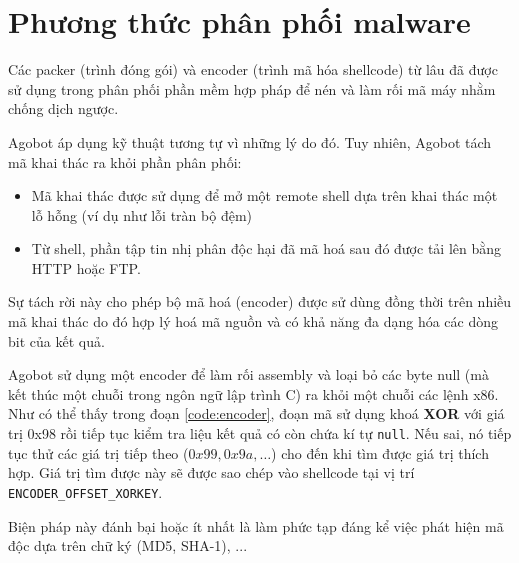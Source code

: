 \section{Phương thức phân phối malware}
Các \gls{packer} (trình đóng gói) và \gls{encoder} (trình mã hóa shellcode) từ lâu đã được sử dụng
trong phân phối phần mềm hợp pháp để nén và làm rối mã máy nhằm chống dịch ngược.

Agobot áp dụng kỹ thuật tương tự vì những lý do đó.
Tuy nhiên, Agobot tách mã khai thác ra khỏi phần phân phối:

\begin{itemize}
\item Mã khai thác được sử dụng để mở một remote shell dựa trên khai thác
một lỗ hỗng (ví dụ như lỗi tràn bộ đệm)
\item Từ shell, phần tập tin nhị phân độc hại đã mã hoá sau đó được tải lên bằng HTTP hoặc FTP.
\end{itemize}

Sự tách rời này cho phép bộ mã hoá (encoder) được sử dùng đồng thời trên
nhiều mã khai thác do đó hợp lý hoá mã nguồn
và có khả năng đa dạng hóa các dòng bit của kết quả.

Agobot sử dụng một \gls{encoder} để làm rối \gls{assembly} và loại bỏ các byte null
(mà kết thúc một chuỗi trong ngôn ngữ lập trình C) ra khỏi một chuỗi các lệnh x86.
Như có thể thấy trong đoạn \ref{code:encoder}, đoạn mã sử dụng khoá \textbf{XOR} với giá trị 0x98 rồi tiếp tục kiểm tra liệu kết quả có còn chứa kí tự \texttt{null}.
Nếu sai, nó tiếp tục thử các giá trị tiếp theo ($0x99, 0x9a, \ldots$) cho đến khi tìm được giá trị thích hợp.
Giá trị tìm được này sẽ được sao chép vào shellcode tại vị trí \texttt{ENCODER\_OFFSET\_XORKEY}.

Biện pháp này đánh bại hoặc ít nhất là làm phức tạp đáng kể việc phát hiện mã độc dựa trên chữ ký (MD5, SHA-1), ...

